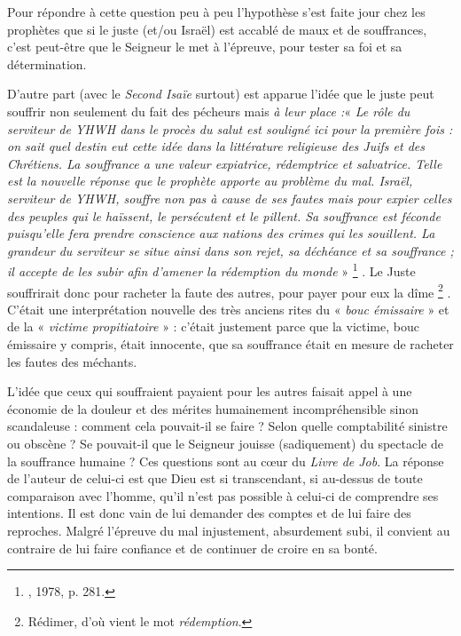  Pour répondre à cette question peu à peu l'hypothèse s'est faite jour chez les prophètes que si le juste (et/ou Israël) est accablé de maux et de souffrances, c'est peut-être que le Seigneur le met à l'épreuve, pour tester sa foi et sa détermination. 

 D'autre part (avec le \emph{Second Isaïe} surtout) est apparue l'idée que le juste peut souffrir non seulement du fait des pécheurs mais \emph{à leur place :}« \emph{Le rôle du serviteur de YHWH dans le procès du salut est souligné ici pour la première fois : on sait quel destin eut cette idée dans la littérature religieuse des Juifs et des Chrétiens. La souffrance a une valeur expiatrice, rédemptrice et salvatrice. Telle est la nouvelle réponse que le prophète apporte au problème du mal. Israël, serviteur de YHWH, souffre non pas à cause de ses fautes mais pour expier celles des peuples qui le haïssent, le persécutent et le pillent. Sa souffrance est féconde puisqu'elle fera prendre conscience aux nations des crimes qui les souillent. La grandeur du serviteur se situe ainsi dans son rejet, sa déchéance et sa souffrance ; il accepte de les subir afin d'amener la rédemption du monde} »%
\footnote{, 1978, p. 281.}%
. Le Juste souffrirait donc pour racheter la faute des autres, pour payer pour eux la dîme%
\footnote{Rédimer, d'où vient le mot \emph{rédemption}.}%
. C'était une interprétation nouvelle des très anciens rites du « \emph{bouc émissaire} » et de la « \emph{victime propitiatoire} » : c'était justement parce que la victime, bouc émissaire y compris, était innocente, que sa souffrance était en mesure de racheter les fautes des méchants. 

 L'idée que ceux qui souffraient payaient pour les autres faisait appel à une économie de la douleur et des mérites humainement incompréhensible sinon scandaleuse : comment cela pouvait-il se faire ? Selon quelle comptabilité sinistre ou obscène ? Se pouvait-il que le Seigneur jouisse (sadiquement) du spectacle de la souffrance humaine ? Ces questions sont au cœur du \emph{Livre de Job}. La réponse de l'auteur de celui-ci est que Dieu est si transcendant, si au-dessus de toute comparaison avec l'homme, qu'il n'est pas possible à celui-ci de comprendre ses intentions. Il est donc vain de lui demander des comptes et de lui faire des reproches. Malgré l'épreuve du mal injustement, absurdement subi, il convient au contraire de lui faire confiance et de continuer de croire en sa bonté. 

